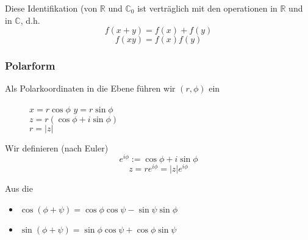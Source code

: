 Diese Identifikation (von $\mathbb{R}$ und $\mathbb{C}_0$ ist verträglich mit den operationen in $\mathbb{R}$ und in $\mathbb{C}$, d.h.
\[f(x+y)=f(x)+f(y)\]
\[f(xy)=f(x)f(y)\]
\subsubsection*{Polarform}
Als Polarkoordinaten in die Ebene führen wir $(r,\phi)$ ein

\begin{figure}[ht]
\begin{minipage}[b]{0.45\linewidth}
\begin{center}
\end{center}

\end{minipage}
\hspace{0.5cm}
\begin{minipage}[b]{0.45\linewidth}
$x=r\cos\phi$\hspace{5mm} $y=r\sin\phi$\\
$z=r\left( \cos\phi + i\sin\phi\right)$\\
$r=\left| z\right|$
\vspace{9mm}
\end{minipage}
\end{figure}

\begin{definition}{}
Wir definieren (nach Euler)\[e^{i\phi}:=\cos\phi+ i\sin\phi\]\[z=re^{i\phi}=\left| z\right|e^{i\phi}\]
\end{definition}

\noindent Aus die 
\begin{itemize}
\item $\cos(\phi+\psi)=\cos\phi\cos\psi -\sin\psi\sin\phi$
\item $\sin(\phi+\psi)=\sin\phi\cos\psi + \cos\phi\sin\psi$
\end{itemize}

